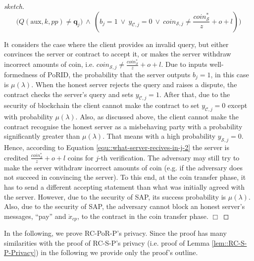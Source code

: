 \begin{proof}[sketch]
     $$\Big(Q(\text{aux},k,{pp})\neq \bm{q}_{\scriptscriptstyle j})\ \wedge \ (b_{\scriptscriptstyle j}=1\ \vee \ y_{\scriptscriptstyle\mathcal{C},j}=0 \ \vee \ coin_{\scriptscriptstyle\mathcal{S},j}\neq \frac{coin_{\scriptscriptstyle\mathcal S}^{\scriptscriptstyle*}}{z}+o+l)\Big)$$
     
       It considers the case where the client provides an invalid query, but  either convinces the server or contract to accept it, or  makes the server   withdraw  incorrect amounts of coin, i.e. $coin_{\scriptscriptstyle\mathcal{S},j}\neq \frac{coin_{\scriptscriptstyle\mathcal S}^{\scriptscriptstyle*}}{z}+o+l$. Due to inputs well-formedness of PoRID, the probability that the server outputs $b_{\scriptscriptstyle j}=1$, in this case is $\mu(\lambda)$.  When the honest server rejects the query and raises a dispute, the contract checks the server's query and sets $y_{\scriptscriptstyle\mathcal{C},j}=1$. After that, due to the security of blockchain the client cannot make the contract to set $y_{\scriptscriptstyle\mathcal{C},j}=0$ except with probability $\mu(\lambda)$. Also, as discussed above, the client cannot make the contract recognise the  honest server as a misbehaving party with a probability significantly greater than $\mu(\lambda)$. That means with a high probability $y_{\scriptscriptstyle\mathcal{S},j}=0$.  Hence, according to Equation \ref{equ::what-server-recives-in-j-2} the server is credited  $\frac{coin_{\scriptscriptstyle\mathcal S}^{\scriptscriptstyle*}}{z}+o+l$ coins for $j$-th verification.   The adversary may still try to  make the server withdraw   incorrect amounts of coin (e.g. if the adversary does not succeed in convincing the server). To this end, at the coin transfer phase, it has to send a  different accepting statement  than what was initially agreed with the server. However, due to the security of SAP, its  success probability is  $\mu(\lambda)$. Also, due to the security of SAP, the adversary cannot block an honest server's  messages, ``pay'' and $\ddot{x}_{\scriptscriptstyle cp}$, to the contract in the coin transfer phase.
 \hfill\(\Box\)\end{proof}
  
  





In the following, we prove  RC-PoR-P's privacy. Since the  proof has many similarities with  the  proof of RC-S-P's privacy (i.e. proof of Lemma \ref{lem::RC-S-P-Privacy}) in the following we provide only the proof's outline.  



